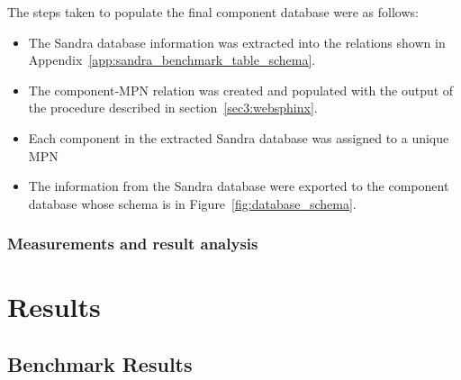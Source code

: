         The steps taken to populate the final component database were as follows:
        \begin{itemize}
            \item The Sandra database information was extracted into the relations shown in Appendix~\ref{app:sandra_benchmark_table_schema}.
            \item The component-MPN relation was created and populated with the output of the procedure described in section~\ref{sec3:websphinx}.
            \item Each component in the extracted Sandra database was assigned to a unique MPN
            \item The information from the Sandra database were exported to the component database whose schema is in Figure~\ref{fig:database_schema}.
        \end{itemize}
    
    \subsubsection*{Measurements and result analysis}
        
    
\section{Results} \label{sec4:results}
\subsection{Benchmark Results} \label{sec4:benchmark_results}


